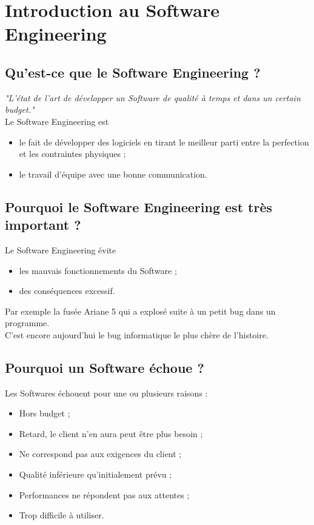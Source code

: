 \section{Introduction au Software Engineering}



\subsection{Qu'est-ce que le Software Engineering ?}
\textit{"L'état de l'art de développer un Software de qualité à temps et dans un certain budget."}
\\Le Software Engineering est
\begin{itemize}
    \item le fait de développer des logiciels en tirant le meilleur parti entre la perfection et les contraintes physiques ;
	\item le travail d'équipe avec une bonne communication.
\end{itemize}




\subsection{Pourquoi le Software Engineering est très important ?}
Le Software Engineering évite
\begin{itemize}
    \item les mauvais fonctionnements du Software ;
	\item des conséquences excessif.
\end{itemize}
Par exemple la fusée Ariane 5 qui a explosé suite à un petit bug dans un programme.
\\C'est encore aujourd'hui le bug informatique le plus chère de l'histoire.

\subsection{Pourquoi un Software échoue ?}
Les Softwares échouent pour une ou plusieurs raisons :
\begin{itemize}
    \item Hors budget ;
    \item Retard, le client n'en aura peut être plus besoin ;
    \item Ne correspond pas aux exigences du client ;
    \item Qualité inférieure qu'initialement prévu ;
    \item Performances ne répondent pas aux attentes ;
    \item Trop difficile à utiliser.
\end{itemize}



